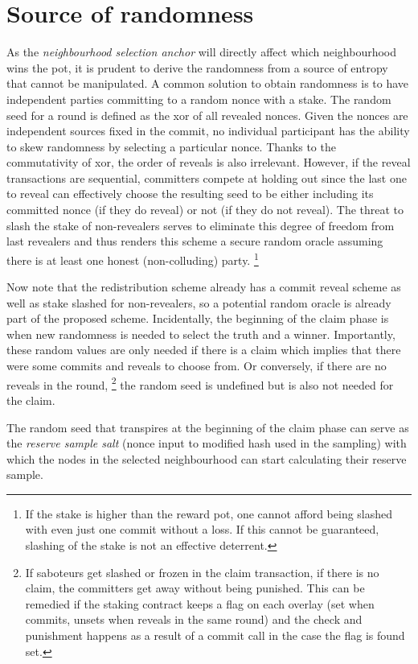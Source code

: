 \chapter{Source of randomness}\label{sec:randomness}

As the \emph{neighbourhood selection anchor} will directly affect which neighbourhood wins the pot, it is prudent to derive the randomness from a source of entropy that cannot be manipulated. A common solution to obtain randomness is to have independent parties committing to a random nonce with a stake. The random seed for a round is defined as the xor of all revealed nonces. Given the nonces are independent sources fixed in the commit, no individual participant has the ability to skew randomness by selecting a particular nonce. Thanks to the commutativity of xor, the order of reveals is also irrelevant. However, if the reveal transactions are sequential, committers compete at holding out since the last one to reveal can effectively choose the resulting seed to be either including its committed nonce (if they do reveal) or not (if they do not reveal). The threat to slash the stake of non-revealers serves to eliminate this degree of freedom from last revealers and thus renders this scheme a secure random oracle assuming there is at least one honest (non-colluding) party.%
%
\footnote{If the stake is higher than the reward pot, one cannot  afford being slashed with even just one commit without a loss. If this cannot be guaranteed, slashing of the stake is not an effective deterrent.}

Now note that the redistribution scheme already has a commit reveal scheme as well as stake slashed for non-revealers, so a potential random oracle is already part of the proposed scheme. Incidentally, the beginning of the claim phase is when new randomness is needed to select the truth and a winner. Importantly, these random values are only needed if there is a claim which implies that there were some commits and reveals to choose from. Or conversely, if there are no reveals in the round,%
%
\footnote{If saboteurs get slashed or frozen in the claim transaction, if there is no claim, the committers get away without being punished. This can be remedied if the staking contract keeps a flag on each overlay (set when commits, unsets when reveals in the same round) and the check and punishment happens as a result of a commit call in the case the flag is found set.}
%
the random seed is undefined but is also not needed for the claim.

The random seed that transpires at the beginning of the claim phase can serve as the \emph{reserve sample salt} (nonce input to modified hash used in the sampling) with which the nodes in the selected neighbourhood can start calculating their reserve sample. 

